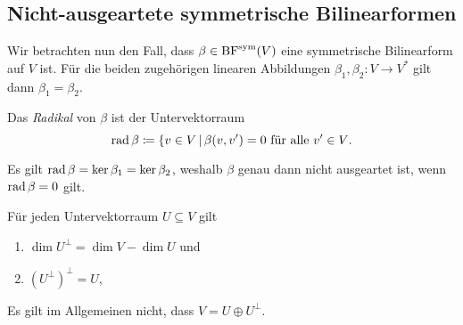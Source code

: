 \subsection{Nicht-ausgeartete symmetrische Bilinearformen}

Wir betrachten nun den Fall, dass $\beta \in \operatorname{BF}^{\operatorname{sym}}(V)$ eine symmetrische Bilinearform auf $V$ ist.
Für die beiden zugehörigen linearen Abbildungen $\beta_1, \beta_2 \colon V \to V^*$ gilt dann $\beta_1 = \beta_2$.

\begin{definition}
  Das \emph{Radikal} von $\beta$ ist der Untervektorraum
  \[
              \operatorname{rad} \beta
    \coloneqq \{v \in V \,|\, \text{$\beta(v,v') = 0$ für alle $v' \in V$}.
  \]
\end{definition}

Es gilt $\operatorname{rad} \beta = \ker \beta_1 = \ker \beta_2$, weshalb $\beta$ genau dann nicht ausgeartet ist, wenn $\operatorname{rad} \beta = 0$ gilt.

\begin{lemma}
  Für jeden Untervektorraum $U \subseteq V$ gilt
  \begin{enumerate}
    \item
      $\dim U^\perp = \dim V - \dim U$ und
    \item
      $(U^\perp)^\perp = U$,
  \end{enumerate}
\end{lemma}

\begin{warning}
  Es gilt im Allgemeinen nicht, dass $V = U \oplus U^\perp$.
\end{warning}



















